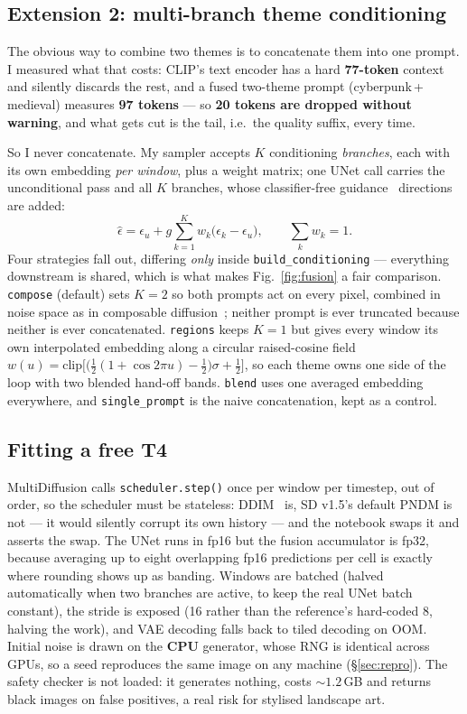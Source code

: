 \documentclass[10pt,a4paper,twocolumn]{article}
\newcommand{\tw}[1]{\texttt{\footnotesize #1}}
\newcommand{\thm}[1]{{\footnotesize\textsf{#1}}}
\begin{document}
\subsection{Extension 2: multi-branch theme conditioning}

The obvious way to combine two themes is to concatenate them into one prompt. I
measured what that costs: CLIP's text encoder has a hard \textbf{77-token} context
and silently discards the rest, and a fused two-theme prompt
(\thm{cyberpunk\,+\,medieval}) measures \textbf{97 tokens} --- so \textbf{20 tokens
are dropped without warning}, and what gets cut is the tail, i.e.\ the quality
suffix, every time.

So I never concatenate. My sampler accepts $K$ conditioning \emph{branches}, each
with its own embedding \emph{per window}, plus a weight matrix; one UNet call
carries the unconditional pass and all $K$ branches, whose classifier-free
guidance~\cite{cfg} directions are added:
\begin{equation}
\hat\epsilon=\epsilon_u+g\sum_{k=1}^{K}w_k\big(\epsilon_k-\epsilon_u\big),\qquad \textstyle\sum_k w_k=1 .
\end{equation}
Four strategies fall out, differing \emph{only} inside \tw{build\_conditioning} ---
everything downstream is shared, which is what makes Fig.~\ref{fig:fusion} a fair
comparison. \tw{compose} (default) sets $K{=}2$ so both prompts act on every
pixel, combined in noise space as in composable diffusion~\cite{composable};
neither prompt is ever truncated because neither is ever concatenated.
\tw{regions} keeps $K{=}1$ but gives every window its own interpolated embedding
along a circular raised-cosine field
$w(u)=\mathrm{clip}\big[\big(\tfrac{1}{2}(1{+}\cos 2\pi u)-\tfrac12\big)\sigma+\tfrac12\big]$,
so each theme owns one side of the loop with two blended hand-off bands.
\tw{blend} uses one averaged embedding everywhere, and \tw{single\_prompt} is the
naive concatenation, kept as a control.

\subsection{Fitting a free T4}

MultiDiffusion calls \tw{scheduler.step()} once per window per timestep, out of
order, so the scheduler must be stateless: DDIM~\cite{ddim} is, SD v1.5's default
PNDM is not --- it would silently corrupt its own history --- and the notebook
swaps it and asserts the swap. The UNet runs in fp16 but the fusion accumulator is
fp32, because averaging up to eight overlapping fp16 predictions per cell is
exactly where rounding shows up as banding. Windows are batched (halved
automatically when two branches are active, to keep the real UNet batch constant),
the stride is exposed (16 rather than the reference's hard-coded 8, halving the
work), and VAE decoding falls back to tiled decoding on OOM. Initial noise is
drawn on the \textbf{CPU} generator, whose RNG is identical across GPUs, so a seed
reproduces the same image on any machine (\S\ref{sec:repro}). The safety checker
is not loaded: it generates nothing, costs ${\sim}1.2$\,GB and returns black
images on false positives, a real risk for stylised landscape art.
\end{document}
